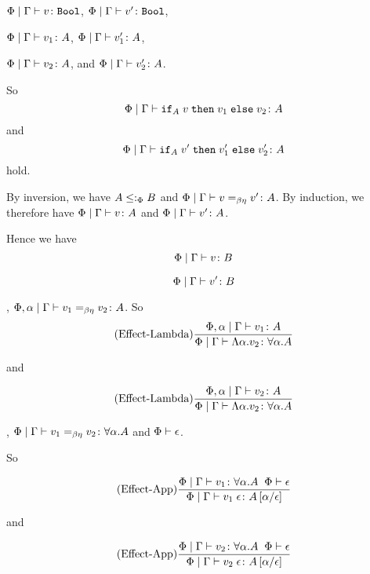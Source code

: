 {    $\Phi\mid\Gamma \vdash v \colon \texttt{Bool}$,
    $\Phi\mid\Gamma \vdash v' \colon \texttt{Bool}$,

    $\Phi\mid\Gamma \vdash v_1 \colon A$,
    $\Phi\mid\Gamma \vdash v_1' \colon A$,

    
    $\Phi\mid\Gamma \vdash v_2 \colon A$, and
    $\Phi\mid\Gamma \vdash v_2' \colon A$.

    So 
    \begin{equation}
        \Phi\mid\Gamma \vdash \texttt{if}_{A}\; v\; \texttt{then}\; v_1 \;\texttt{else} \; v_2 \colon A
    \end{equation}
    and
    \begin{equation}
        \Phi\mid\Gamma \vdash \texttt{if}_{A}\; v'\; \texttt{then}\; v_1' \;\texttt{else} \; v_2' \colon A
    \end{equation}
    hold.

    By inversion, we have $A \leq:_\Phi B$ and $\Phi\mid\Gamma \vdash v =_{\beta\eta} v' \colon A$. By induction, we therefore have $\Phi\mid\Gamma \vdash v \colon A$ and $\Phi\mid\Gamma \vdash v' \colon A$.

    Hence we have 
    \begin{equation}
        \Phi\mid\Gamma \vdash v \colon B
    \end{equation}

    
    \begin{equation}
        \Phi\mid\Gamma \vdash v' \colon B
    \end{equation}


    \bi, $\Phi,\alpha\mid\Gamma \vdash v_1 =_{\beta\eta} v_2 \colon A$.
    So \begin{equation}
        (\text{Effect-Lambda}) \frac{\Phi,\alpha\mid\Gamma \vdash v_1 \colon A}{\Phi\mid\Gamma \vdash \Lambda \alpha. v_2 \colon \forall \alpha. A}
    \end{equation}

    and

    \begin{equation}
        (\text{Effect-Lambda}) \frac{\Phi,\alpha\mid\Gamma \vdash v_2 \colon A}{\Phi\mid\Gamma \vdash \Lambda \alpha. v_2 \colon \forall \alpha. A}
    \end{equation}



    \bi, $\Phi\mid\Gamma \vdash v_1 =_{\beta\eta} v_2 \colon \forall \alpha. A$ and $\Phi\vdash \epsilon$.

    So 

    \begin{equation}
        (\text{Effect-App}) \frac{\Phi\mid\Gamma \vdash v_1 \colon \forall \alpha. A\;\;\Phi\vdash \epsilon}{\Phi\mid\Gamma \vdash v_1\;\epsilon \colon A\left[\alpha / \epsilon\right]}
    \end{equation}

    and

    \begin{equation}
        (\text{Effect-App}) \frac{\Phi\mid\Gamma \vdash v_2 \colon \forall \alpha. A\;\;\Phi\vdash \epsilon}{\Phi\mid\Gamma \vdash v_2\;\epsilon \colon A\left[\alpha / \epsilon\right]}
    \end{equation}
}   
    
\ifdefined\NoDocument
\else
\documentclass{report}





   \BetaEtaEquivalence

\fi